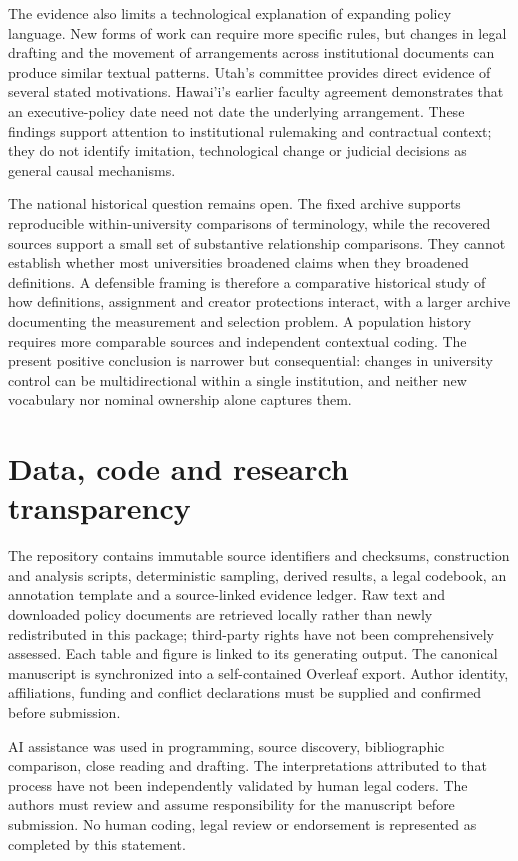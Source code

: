 \documentclass[12pt]{article}
\begin{document}
The evidence also limits a technological explanation of expanding policy language. New forms of work can require more specific rules, but changes in legal drafting and the movement of arrangements across institutional documents can produce similar textual patterns. Utah's committee provides direct evidence of several stated motivations. Hawai'i's earlier faculty agreement demonstrates that an executive-policy date need not date the underlying arrangement. These findings support attention to institutional rulemaking and contractual context; they do not identify imitation, technological change or judicial decisions as general causal mechanisms.

The national historical question remains open. The fixed archive supports reproducible within-university comparisons of terminology, while the recovered sources support a small set of substantive relationship comparisons. They cannot establish whether most universities broadened claims when they broadened definitions. A defensible framing is therefore a comparative historical study of how definitions, assignment and creator protections interact, with a larger archive documenting the measurement and selection problem. A population history requires more comparable sources and independent contextual coding. The present positive conclusion is narrower but consequential: changes in university control can be multidirectional within a single institution, and neither new vocabulary nor nominal ownership alone captures them.

\section*{Data, code and research transparency}
The repository contains immutable source identifiers and checksums, construction and analysis scripts, deterministic sampling, derived results, a legal codebook, an annotation template and a source-linked evidence ledger. Raw text and downloaded policy documents are retrieved locally rather than newly redistributed in this package; third-party rights have not been comprehensively assessed. Each table and figure is linked to its generating output. The canonical manuscript is synchronized into a self-contained Overleaf export. Author identity, affiliations, funding and conflict declarations must be supplied and confirmed before submission.

AI assistance was used in programming, source discovery, bibliographic comparison, close reading and drafting. The interpretations attributed to that process have not been independently validated by human legal coders. The authors must review and assume responsibility for the manuscript before submission. No human coding, legal review or endorsement is represented as completed by this statement.

\begingroup{}\small

\endgroup
\end{document}
